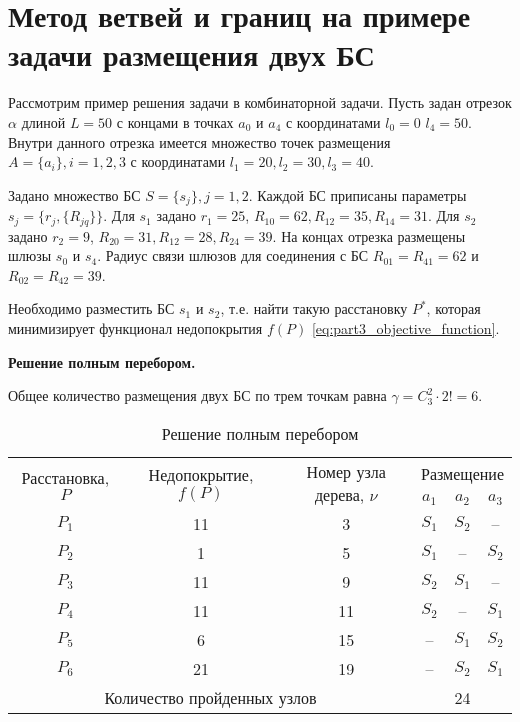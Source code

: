 \section{Метод ветвей и границ на примере задачи размещения двух БС}\label{part4:bnb_algorithm}

Рассмотрим пример решения задачи в комбинаторной задачи. Пусть задан отрезок $\alpha$ длиной $L = 50$ с концами в точках $a_0$ и $a_4$ с координатами $l_0 = 0$ $l_4 = 50$. Внутри данного отрезка имеется множество точек размещения $A = \{a_i\}, i = 1, 2, 3$ с координатами $l_1 = 20, l_2 = 30, l_3 = 40$. 

Задано множество БС $S = \{ s_j \} , j = 1, 2$. Каждой БС приписаны параметры $s_j = \{ r_j, \{R_{jq}\}\}$.  Для $s_1$ задано $r_1 = 25$, $R_{10} = 62, R_{12} = 35, R_{14} = 31$. Для $s_2$ задано $r_2 = 9$, $R_{20} = 31, R_{12} = 28, R_{24} = 39$.
На концах отрезка размещены шлюзы $s_0$ и $s_4$. Радиус связи шлюзов для соединения с БС $R_{01} = R_{41} = 62$ и $R_{02} = R_{42} = 39$. 


Необходимо разместить БС $s_1$ и $s_2$, т.е. найти такую расстановку $P^*$, которая минимизирует функционал недопокрытия $f(P)$ \cref{eq:part3_objective_function}.

\textbf{Решение полным перебором.}

Общее количество размещения двух БС по трем точкам равна $\gamma = C^2_3 \cdot 2! = 6$.


\begin{table}[h!]\centering
  \begin{tabular}{| c | c | c | c  c c|}
    \hline
    \multirow{2}{*}{Расстановка, $P$} & \multirow{2}{*}{Недопокрытие, $f(P)$} & \multirow{2}{*}{Номер узла дерева, $\nu$} &  \multicolumn{3}{c|}{Размещение} \\\cline{4-6}

    &&& $a_1$&	$a_2$&	$a_3$\\
    \hline
    $P_1$ & 11 & 3 & $S_1$ & $S_2$ & -- \\
    $P_2$ & 1 & 5 & $S_1$ & -- & $S_2$ \\
    $P_3$ & 11 & 9 & $S_2$ & $S_1$ & --  \\
    $P_4$ & 11 & 11 & $S_2$ & -- & $S_1$ \\
    $P_5$ & 6 & 15 & -- & $S_1$  & $S_2$\\
    $P_6$ & 21 & 19 & -- & $S_2$  & $S_1$\\
    \hline
    \multicolumn{3}{|c|}{Количество пройденных узлов} & \multicolumn{3}{|c|}{24} \\

    \hline
  \end{tabular}\caption{Решение полным перебором}\label{part4:brute_force_solution}
\end{table}



